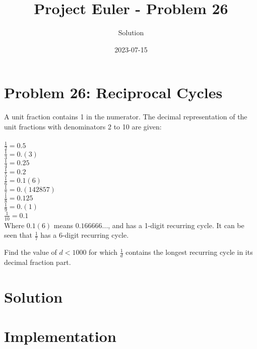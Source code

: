 \documentclass{article}
\title{Project Euler - Problem 26}
\author{Solution}
\date{2023-07-15}
\begin{document}
\maketitle

\section*{Problem 26: Reciprocal Cycles}

A unit fraction contains 1 in the numerator. The decimal representation of the unit fractions with denominators 2 to 10 are given:
\\\\
$\frac{1}{2} = 0.5$ \\
$\frac{1}{3} = 0.(3)$ \\
$\frac{1}{4} = 0.25$ \\
$\frac{1}{5} = 0.2$ \\
$\frac{1}{6} = 0.1(6)$ \\
$\frac{1}{7} = 0.(142857)$ \\
$\frac{1}{8} = 0.125$ \\
$\frac{1}{9} = 0.(1)$ \\
$\frac{1}{10} = 0.1$ \\

Where $0.1(6)$ means $0.166666...$, and has a 1-digit recurring cycle. It can be seen that $\frac{1}{7}$ has a 6-digit recurring cycle.

Find the value of $d < 1000$ for which $\frac{1}{d}$ contains the longest recurring cycle in its decimal fraction part.

\section*{Solution}

\section*{Implementation}
\end{document}
